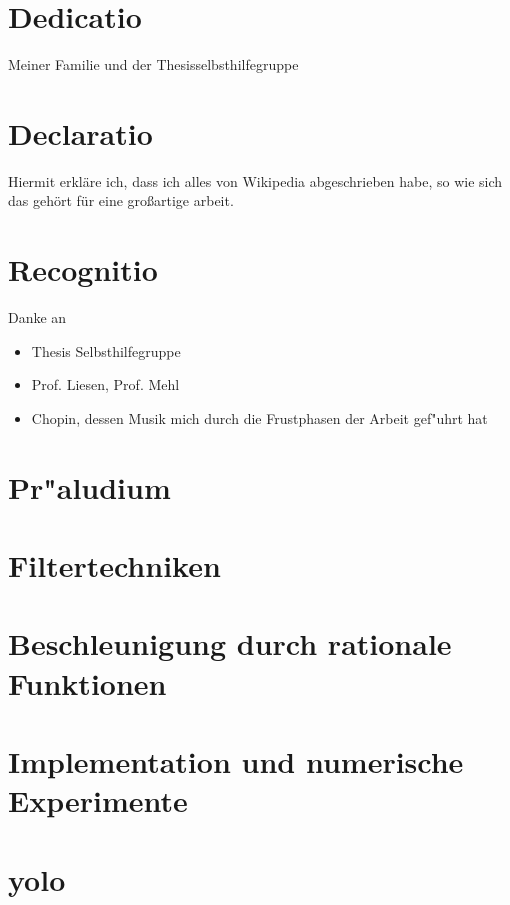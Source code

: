 \documentclass[12pt, twoside]{report} %
\begin{document}


\chapter*{Dedicatio}
Meiner Familie und der Thesisselbsthilfegruppe

\chapter*{Declaratio}
Hiermit erkläre ich, dass ich alles von Wikipedia abgeschrieben habe, so
wie sich das gehört für eine großartige arbeit.

\chapter*{Recognitio}
Danke an
\begin{itemize}
\item Thesis Selbsthilfegruppe
\item Prof. Liesen, Prof. Mehl
\item Chopin, dessen Musik mich durch die Frustphasen der Arbeit gef"uhrt hat
\end{itemize}

\tableofcontents

\chapter{Pr"aludium}%


\chapter{Filtertechniken} %


\chapter{Beschleunigung durch rationale Funktionen}%


\chapter{Implementation und numerische Experimente}


\chapter{}%


\appendix
\chapter{yolo}


\nocite{*}
\printbibliography
\end{document}
